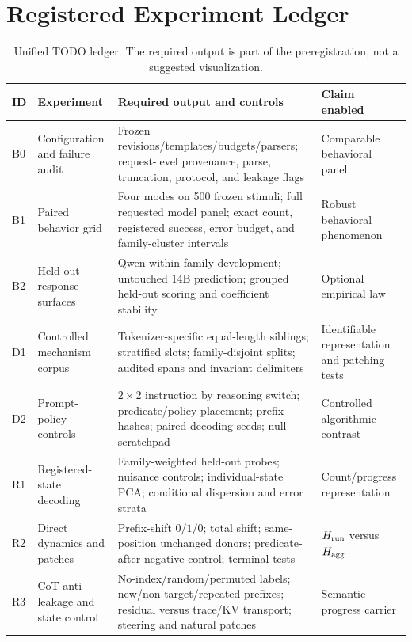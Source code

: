 \section{Registered Experiment Ledger}
\label{app:ledger}

\begin{table}[H]
\centering
\scriptsize
\caption{Unified TODO ledger. The required output is part of the
preregistration, not a suggested visualization.}
\begin{tabularx}{\textwidth}{@{}P{.07\textwidth}P{.19\textwidth}P{.36\textwidth}Y@{}}
\toprule
ID & Experiment & Required output and controls & Claim enabled \\
\midrule
B0 & Configuration and failure audit
  & Frozen revisions/templates/budgets/parsers; request-level provenance,
  parse, truncation, protocol, and leakage flags
  & Comparable behavioral panel \\
B1 & Paired behavior grid
  & Four modes on 500 frozen stimuli; full requested model panel; exact count,
  registered success, error budget, and family-cluster intervals
  & Robust behavioral phenomenon \\
B2 & Held-out response surfaces
  & Qwen within-family development; untouched 14B prediction; grouped
  held-out scoring and coefficient stability
  & Optional empirical law \\
D1 & Controlled mechanism corpus
  & Tokenizer-specific equal-length siblings; stratified slots;
  family-disjoint splits; audited spans and invariant delimiters
  & Identifiable representation and patching tests \\
D2 & Prompt-policy controls
  & \(2\times2\) instruction by reasoning switch; predicate/policy placement;
  prefix hashes; paired decoding seeds; null scratchpad
  & Controlled algorithmic contrast \\
R1 & Registered-state decoding
  & Family-weighted held-out probes; nuisance controls; individual-state PCA;
  conditional dispersion and error strata
  & Count/progress representation \\
R2 & Direct dynamics and patches
  & Prefix-shift \(0/1/0\); total shift; same-position unchanged donors;
  predicate-after negative control; terminal tests
  & \(H_{\rm run}\) versus \(H_{\rm agg}\) \\
R3 & CoT anti-leakage and state control
  & No-index/random/permuted labels; new/non-target/repeated prefixes;
  residual versus trace/KV transport; steering and natural patches
  & Semantic progress carrier \\

\end{tabularx}
\end{table}
